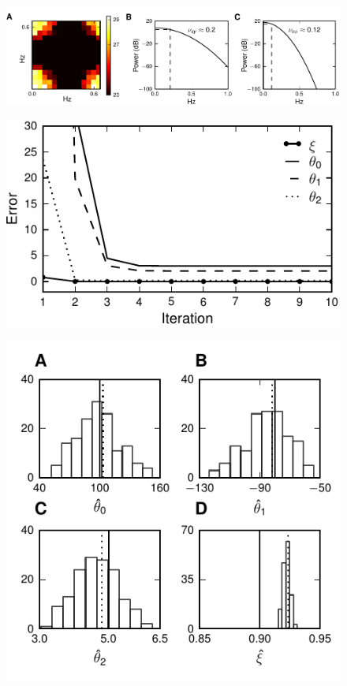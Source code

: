 \documentclass[5p,authoryear]{elsarticle}
\begin{document}
\clearpage
\newpage
\begin{figure}[!ht] 
\begin{center}
\includegraphics{./Graph/pdf/fig5.pdf}	
\end{center}
\caption{}
\label{fig:Figure5}
\end{figure}
\clearpage
\newpage
\begin{figure}[!ht]
\begin{center}
\includegraphics{./Graph/pdf/fig6.pdf}
\end{center}
\caption{}
\label{fig:Figure6}
\end{figure}
\clearpage
\newpage
\begin{figure}[!ht]
\begin{center}
\includegraphics{./Graph/pdf/fig7.pdf}
\end{center}
\caption{} 
\label{fig:Figure7}
\end{figure}
\end{document}
